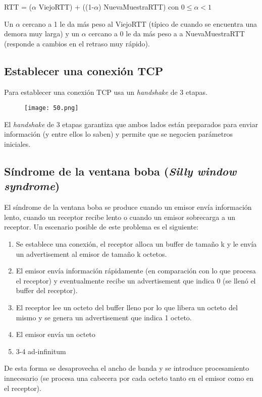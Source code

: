 \documentclass{book}
\begin{document}
	\begin{center}
		RTT = ($\alpha$ ViejoRTT) + ((1-$\alpha$) NuevaMuestraRTT) con $0\leq\alpha<1$
	\end{center}
	
	Un $\alpha$ cercano a 1 le da más peso al ViejoRTT (típico de cuando se encuentra una demora muy larga) y un $\alpha$ cercano a 0 le da más peso a a NuevaMuestraRTT (responde a cambios en el retraso muy rápido).
	
	\subsection{Establecer una conexión TCP}
	Para establecer una conexión TCP usa un \textit{handshake} de 3 etapas.
	
	\begin{figure}[H]
		\centering
		\texttt{[image: 50.png]}
	\end{figure}
	
	El \textit{handshake} de 3 etapas garantiza que ambos lados están preparados para enviar información (y entre ellos lo saben) y permite que se negocien parámetros iniciales.
	
	\subsection{Síndrome de la ventana boba (\textit{Silly window syndrome})}
	El síndrome de la ventana boba se produce cuando un emisor envía información lento, cuando un receptor recibe lento o cuando un emisor sobrecarga a un receptor. Un escenario posible de este problema es el siguiente:
	
	\begin{enumerate}
		\item Se establece una conexión, el receptor alloca un buffer de tamaño k y le envía un advertisement al emisor de tamaño k octetos.
		\item El emisor envía información rápidamente (en comparación con lo que procesa el receptor) y eventualmente recibe un advertisement que indica 0 (se llenó el buffer del receptor).
		\item El receptor lee un octeto del buffer lleno por lo que libera un octeto del mismo y se genera un advertisement que indica 1 octeto.
		\item El emisor envía un octeto
		\item 3-4 ad-infinitum
	\end{enumerate}
	
	De esta forma se desaprovecha el ancho de banda y se introduce procesamiento innecesario (se procesa una cabecera por cada octeto tanto en el emisor como en el receptor).
	
\end{document}
